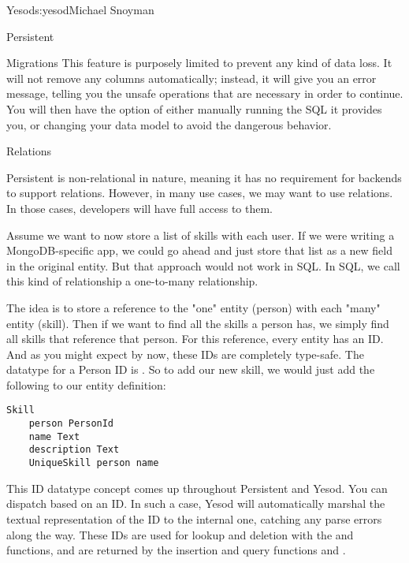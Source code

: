 \begin{aosachapter}{Yesod}{s:yesod}{Michael Snoyman}
\begin{aosasect1}{Persistent}
\begin{aosasect2}{Migrations}
This feature is purposely limited to prevent any kind of data loss. It
will not remove any columns automatically; instead, it will give you
an error message, telling you the unsafe operations that are necessary
in order to continue. You will then have the option of either manually
running the SQL it provides you, or changing your data model to avoid the
dangerous behavior.

\end{aosasect2}

\begin{aosasect2}{Relations}

Persistent is non-relational in nature, meaning it has no requirement
for backends to support relations. However, in many use cases, we may
want to use relations. In those cases, developers will have full
access to them.

Assume we want to now store a list of skills with each user. If we
were writing a MongoDB-specific app, we could go ahead and just store
that list as a new field in the original  entity. But that
approach would not work in SQL. In SQL, we call this kind of
relationship a one-to-many relationship.

The idea is to store a reference to the "one" entity (person) with
each "many" entity (skill). Then if we want to find all the skills a
person has, we simply find all skills that reference that person. For
this reference, every entity has an ID. And as you might expect by
now, these IDs are completely type-safe. The datatype for a Person ID
is . So to add our new skill, we would just add the
following to our entity definition:

\begin{verbatim}
Skill
    person PersonId
    name Text
    description Text
    UniqueSkill person name
\end{verbatim}

This ID datatype concept comes up throughout Persistent and Yesod. You
can dispatch based on an ID. In such a case, Yesod will automatically
marshal the textual representation of the ID to the internal one,
catching any parse errors along the way. These IDs are used for lookup
and deletion with the  and  functions, and are
returned by the insertion and query functions  and
.

\end{aosasect2}

\end{aosasect1}


\end{aosachapter}

